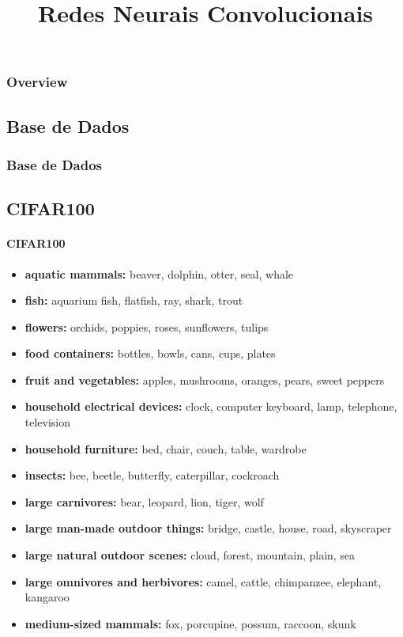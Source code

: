 \documentclass{beamer}
\title{Redes Neurais Convolucionais}
\begin{document}
\maketitle

\begin{frame}[allowframebreaks]
\frametitle{Overview}
\tableofcontents
\end{frame}

\begin{frame}
\section{Base de Dados}
\frametitle{Base de Dados}
\subsection{CIFAR100}
\framesubtitle{CIFAR100}

\begin{itemize}
    \item \textbf{aquatic mammals:} 	beaver, dolphin, otter, seal, whale
    \item \textbf{fish:} 	aquarium fish, flatfish, ray, shark, trout
    \item \textbf{flowers:} 	orchids, poppies, roses, sunflowers, tulips
    \item \textbf{food containers:} 	bottles, bowls, cans, cups, plates
    \item \textbf{fruit and vegetables:} 	apples, mushrooms, oranges, pears, sweet peppers
    \item \textbf{household electrical devices:} 	clock, computer keyboard, lamp, telephone, television
    \item \textbf{household furniture:} 	bed, chair, couch, table, wardrobe
    \item \textbf{insects:} 	bee, beetle, butterfly, caterpillar, cockroach
    \item \textbf{large carnivores:} 	bear, leopard, lion, tiger, wolf
    \item \textbf{large man-made outdoor things:} 	bridge, castle, house, road, skyscraper
    \item \textbf{large natural outdoor scenes:} 	cloud, forest, mountain, plain, sea
    \item \textbf{large omnivores and herbivores:} 	camel, cattle, chimpanzee, elephant, kangaroo
    \item \textbf{medium-sized mammals:} 	fox, porcupine, possum, raccoon, skunk

\end{itemize}

\end{frame}
\end{document}
